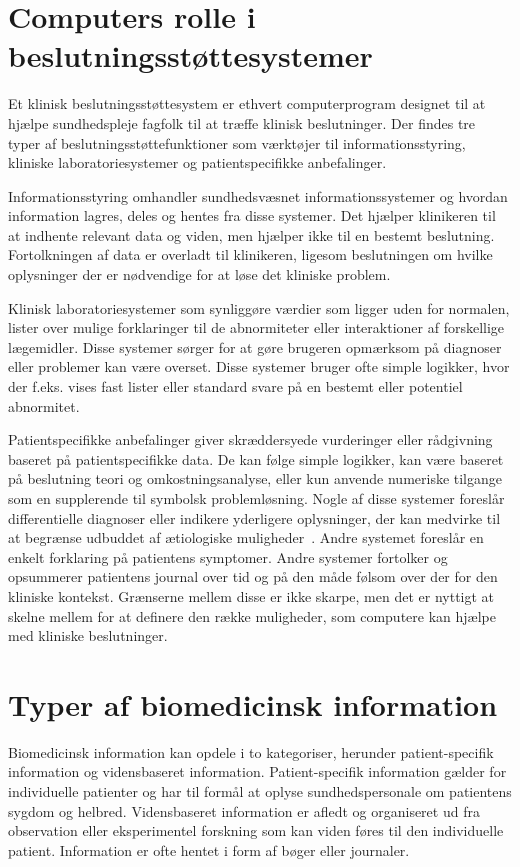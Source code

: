 \section{Computers rolle i beslutningsstøttesystemer}
Et klinisk beslutningsstøttesystem er ethvert computerprogram designet til at hjælpe sundhedspleje fagfolk til at træffe klinisk beslutninger. Der findes tre typer af beslutningsstøttefunktioner som værktøjer til informationsstyring, kliniske laboratoriesystemer og patientspecifikke anbefalinger. \citep{Masys2006}

Informationsstyring omhandler sundhedsvæsnet informationssystemer og hvordan information lagres, deles og hentes fra disse systemer. Det hjælper klinikeren til at indhente relevant data og viden, men hjælper ikke til en bestemt beslutning. Fortolkningen af data er overladt til klinikeren, ligesom beslutningen om hvilke oplysninger der er nødvendige for at løse det kliniske problem.\citep{Masys2006}

Klinisk laboratoriesystemer som synliggøre værdier som ligger uden for normalen, lister over mulige forklaringer til de abnormiteter eller interaktioner af forskellige lægemidler. Disse systemer sørger for at gøre brugeren opmærksom på diagnoser eller problemer kan være overset. Disse systemer bruger ofte simple logikker, hvor der f.eks. vises fast lister eller standard svare på en bestemt eller potentiel abnormitet. \citep{Masys2006}

Patientspecifikke anbefalinger giver skræddersyede vurderinger eller rådgivning baseret på patientspecifikke data. De kan følge simple logikker, kan være baseret på beslutning teori og omkostningsanalyse, eller kun anvende numeriske tilgange som en supplerende til symbolsk problemløsning. Nogle af disse systemer foreslår differentielle diagnoser eller indikere yderligere oplysninger, der kan medvirke til at begrænse udbuddet af ætiologiske muligheder~. Andre systemet foreslår en enkelt forklaring på patientens symptomer. Andre systemer fortolker og opsummerer patientens journal over tid og på den måde følsom over der for den kliniske kontekst. Grænserne mellem disse er ikke skarpe, men det er nyttigt at skelne mellem for at definere den række muligheder, som computere kan hjælpe  med kliniske beslutninger. \citep{Masys2006}

\section{Typer af biomedicinsk information}
Biomedicinsk information kan opdele i to kategoriser, herunder patient-specifik information og vidensbaseret information. Patient-specifik information gælder for individuelle patienter og har til formål at oplyse sundhedspersonale om patientens sygdom og helbred. Vidensbaseret information er afledt og organiseret ud fra observation eller eksperimentel forskning som kan viden føres til den individuelle patient. Information er ofte hentet i form af bøger eller journaler.  \citep{Masys2006a} 

